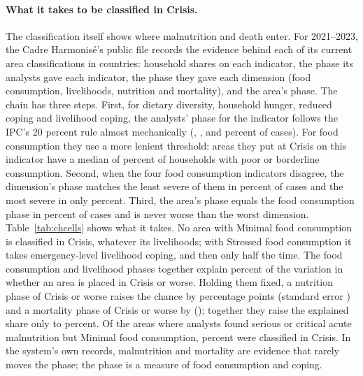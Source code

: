 \documentclass[11pt]{article}
\begin{document}
\paragraph{What it takes to be classified in Crisis.} The classification itself shows where malnutrition and death enter. For 2021--2023, the Cadre Harmonis\'e's public file records the evidence behind each of its \cxAreaN{} current area classifications in \cxCountries{} countries: household shares on each indicator, the phase its analysts gave each indicator, the phase they gave each dimension (food consumption, livelihoods, nutrition and mortality), and the area's phase. The chain has three steps. First, for dietary diversity, household hunger, reduced coping and livelihood coping, the analysts' phase for the indicator follows the IPC's 20 percent rule almost mechanically (\cxRuleHdds{}, \cxRuleHhs{}, \cxRuleRcsi{} and \cxRuleLcs{} percent of cases). For food consumption they use a more lenient threshold: areas they put at Crisis on this indicator have a median of \cxFcgMedThree{} percent of households with poor or borderline consumption. Second, when the four food consumption indicators disagree, the dimension's phase matches the least severe of them in \cxDimMin{} percent of cases and the most severe in only \cxDimMax{} percent. Third, the area's phase equals the food consumption phase in \cxAreaFood{} percent of cases and is never worse than the worst dimension. Table~\ref{tab:chcells} shows what it takes. No area with Minimal food consumption is classified in Crisis, whatever its livelihoods; with Stressed food consumption it takes emergency-level livelihood coping, and then only half the time. The food consumption and livelihood phases together explain \cxRtwoCells{} percent of the variation in whether an area is placed in Crisis or worse. Holding them fixed, a nutrition phase of Crisis or worse raises the chance by \cxNut{} percentage points (standard error \cxNutSe{}) and a mortality phase of Crisis or worse by \cxMort{} (\cxMortSe{}); together they raise the explained share only to \cxRtwoAll{} percent. Of the \cxNutFoodOneN{} areas where analysts found serious or critical acute malnutrition but Minimal food consumption, \cxNutFoodOneP{} percent were classified in Crisis. In the system's own records, malnutrition and mortality are evidence that rarely moves the phase; the phase is a measure of food consumption and coping.
\end{document}
